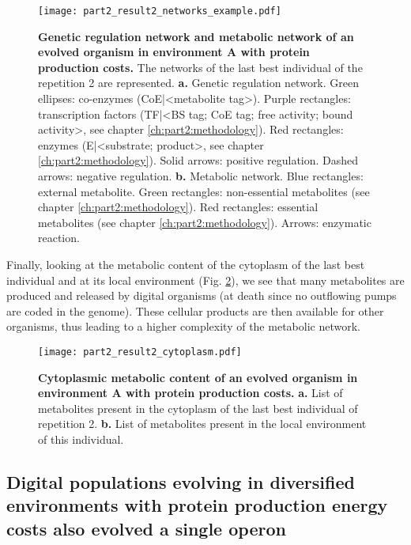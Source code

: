 \begin{figure}[!h]
\centering
\texttt{[image: part2\_result2\_networks\_example.pdf]}
\caption[Genetic regulation network and metabolic network of an evolved organism in environment A with protein production costs.]
{\textbf{Genetic regulation network and metabolic network of an evolved organism in environment A with protein production costs.}
The networks of the last best individual of the repetition 2 are represented.
\textbf{a.} Genetic regulation network. Green ellipses: co-enzymes (CoE|<metabolite tag>). Purple rectangles: transcription factors (TF|<BS tag; CoE tag; free activity; bound activity>, see chapter \ref{ch:part2:methodology}). Red rectangles: enzymes (E|<substrate; product>, see chapter \ref{ch:part2:methodology}). Solid arrows: positive regulation. Dashed arrows: negative regulation.
\textbf{b.} Metabolic network. Blue rectangles: external metabolite. Green rectangles: non-essential metabolites (see chapter \ref{ch:part2:methodology}). Red rectangles: essential metabolites (see chapter \ref{ch:part2:methodology}). Arrows: enzymatic reaction. 
}
\label{fig:part2:second_result:networks_example}
\end{figure}

Finally, looking at the metabolic content of the cytoplasm of the last best individual and at its local environment (Fig. \ref{fig:part2:second_result:cytoplasm}), we see that many metabolites are produced and released by digital organisms (at death since no outflowing pumps are coded in the genome). These cellular products are then available for other organisms, thus leading to a higher complexity of the metabolic network.

\begin{figure}[!h]
\centering
\texttt{[image: part2\_result2\_cytoplasm.pdf]}
\caption[Cytoplasmic metabolic content of an evolved organism in environment A with protein production costs.]
{\textbf{Cytoplasmic metabolic content of an evolved organism in environment A with protein production costs.}
\textbf{a.} List of metabolites present in the cytoplasm of the last best individual of repetition 2.
\textbf{b.} List of metabolites present in the local environment of this individual.}
\label{fig:part2:second_result:cytoplasm}
\end{figure}


\subsection{Digital populations evolving in diversified environments with protein production energy costs also evolved a single operon}
\label{subsec:part2:second_result:environment_B}

